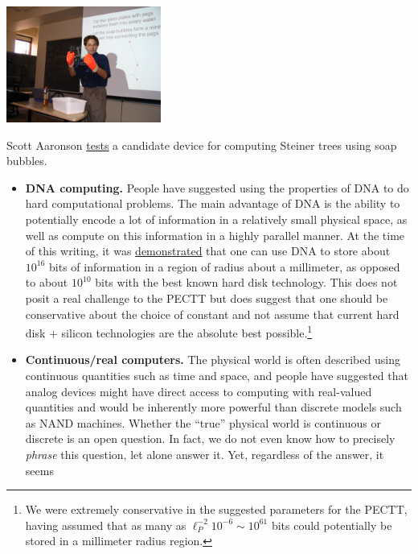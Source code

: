 \begin{marginfigure}
\centering
\includegraphics[width=\linewidth, height=1.5in, keepaspectratio]{../figure/aaronsonsoapbubble.jpg}
\caption{Scott Aaronson
\href{http://www.scottaaronson.com/blog/?p=266}{tests} a candidate
device for computing Steiner trees using soap bubbles.}
\label{aaronsonsoapfig}
\end{marginfigure}

\begin{itemize}
\item
  \textbf{DNA computing.} People have suggested using the properties of
  DNA to do hard computational problems. The main advantage of DNA is
  the ability to potentially encode a lot of information in a relatively
  small physical space, as well as compute on this information in a
  highly parallel manner. At the time of this writing, it was
  \href{http://science.sciencemag.org/content/337/6102/1628.full}{demonstrated}
  that one can use DNA to store about \(10^{16}\) bits of information in
  a region of radius about a millimeter, as opposed to about \(10^{10}\)
  bits with the best known hard disk technology. This does not posit a
  real challenge to the PECTT but does suggest that one should be
  conservative about the choice of constant and not assume that current
  hard disk + silicon technologies are the absolute best
  possible.\footnote{We were extremely conservative in the suggested
    parameters for the PECTT, having assumed that as many as
    \(\ell_P^{-2}10^{-6} \sim 10^{61}\) bits could potentially be stored
    in a millimeter radius region.}
\item
  \textbf{Continuous/real computers.} The physical world is often
  described using continuous quantities such as time and space, and
  people have suggested that analog devices might have direct access to
  computing with real-valued quantities and would be inherently more
  powerful than discrete models such as NAND machines. Whether the
  ``true'' physical world is continuous or discrete is an open question.
  In fact, we do not even know how to precisely \emph{phrase} this
  question, let alone answer it. Yet, regardless of the answer, it seems

\end{itemize}
